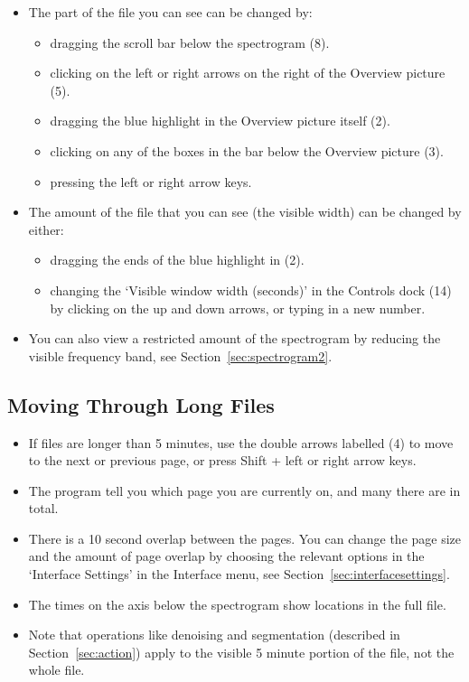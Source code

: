 \documentclass{article}
\begin{document}
\begin{itemize}
\item The part of the file you can see can be changed by:
	\begin{itemize}
	\item dragging the scroll bar below the spectrogram (8).
	\item clicking on the left or right arrows on the right of the Overview picture (5).
	\item dragging the blue highlight in the Overview picture itself (2). 
	\item clicking on any of the boxes in the bar below the Overview picture (3).
	\item pressing the left or right arrow keys.
	\end{itemize}
	
\item The amount of the file that you can see (the visible width) can be changed by either: 
	\begin{itemize}
	\item dragging the ends of the blue highlight in (2).
	\item changing the `Visible window width (seconds)' in the Controls dock (14) by clicking on the up and down arrows, or typing in a new number.
	\end{itemize}

\item You can also view a restricted amount of the spectrogram by reducing the visible frequency band, see Section~\ref{sec:spectrogram2}. 
\end{itemize}

\subsection{Moving Through Long Files}

\begin{itemize}
\item If files are longer than 5 minutes, use the double arrows labelled (4) to move to the next or previous page, or press Shift + left or right arrow keys. 
\item The program tell you which page you are currently on, and many there are in total. 
\item There is a 10 second overlap between the pages. You can change the page size and the amount of page overlap by choosing the relevant options in the `Interface Settings' in the Interface menu, see Section~\ref{sec:interfacesettings}. 
\item The times on the axis below the spectrogram show locations in the full file.
\item Note that operations like denoising and segmentation (described in Section~\ref{sec:action}) apply to the visible 5 minute portion of the file, not the whole file.
\end{itemize}
\end{document}
